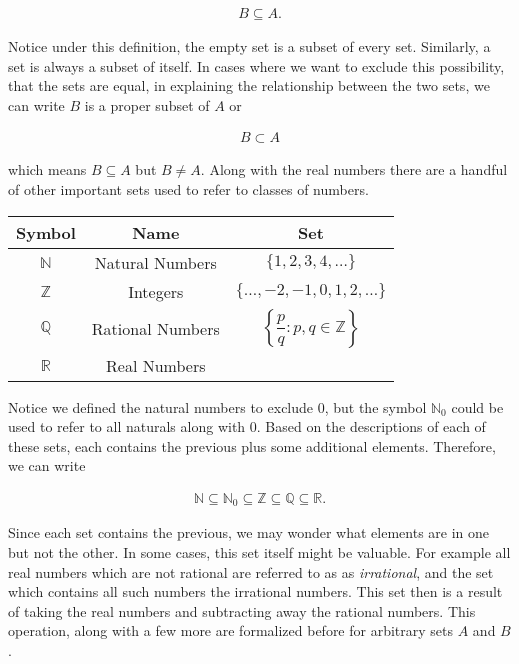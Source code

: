 \documentclass[twoside]{report}
\begin{document}
\begin{align*}
	B \subseteq A.
\end{align*}

Notice under this definition, the empty set is a subset of every set. Similarly, a set is always a subset of itself. In cases where we want to exclude this possibility, that the sets are equal, in explaining the relationship between the two sets, we can write $B$ is a proper subset of $A$ or 

\begin{align*}
	B \subset A
\end{align*}

which means $B \subseteq A$ but $B \neq A$. Along with the real numbers there are a handful of other important sets used to refer to classes of numbers.

\vspace{\baselineskip}
\begin{center}
	\begin{tabular}{ccc}
		\toprule
		Symbol & Name & Set \\
		\midrule
		$\mathbb{N}$ & Natural Numbers & $\{1, 2, 3, 4, \dots\}$ \\[10pt]
		$\mathbb{Z}$ & Integers & $\{\dots, -2, -1, 0, 1, 2, \dots\}$ \\[10pt]
		$\mathbb{Q}$ & Rational Numbers & $\left\{ \dfrac{p}{q} : p,q \in \mathbb{Z}\right\}$ \\[10pt]
		$\mathbb{R}$ & Real Numbers & \\
		\bottomrule
	\end{tabular}
\end{center}
\vspace{\baselineskip}

Notice we defined the natural numbers to exclude 0, but the symbol $\mathbb{N}_0$ could be used to refer to all naturals along with 0. Based on the descriptions of each of these sets, each contains the previous plus some additional elements. Therefore, we can write

\begin{align}
	\mathbb{N} \subseteq \mathbb{N}_0 \subseteq \mathbb{Z} \subseteq \mathbb{Q} \subseteq \mathbb{R}.
\end{align}

Since each set contains the previous, we may wonder what elements are in one but not the other. In some cases, this set itself might be valuable. For example all real numbers which are not rational are  referred to as as \emph{irrational},  and the set which contains all such numbers the irrational numbers. This set then is a result of taking the real numbers and subtracting away the rational numbers. This operation, along with a few more are formalized before for arbitrary sets $A$ and $B$.
\end{document}
